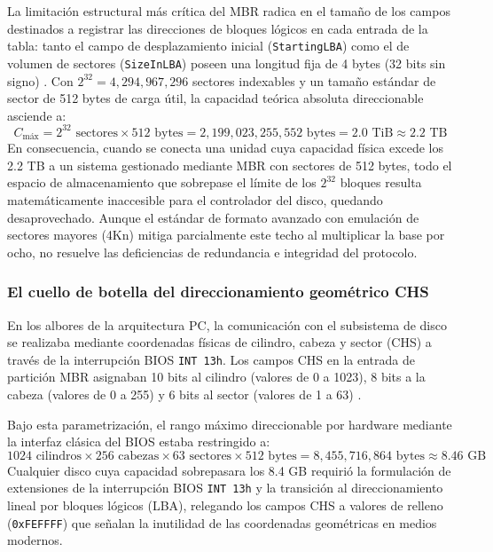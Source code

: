 \documentclass[12pt]{article}
\begin{document}
La limitación estructural más crítica del MBR radica en el tamaño de los campos destinados a registrar las direcciones de bloques lógicos en cada entrada de la tabla: tanto el campo de desplazamiento inicial (\texttt{StartingLBA}) como el de volumen de sectores (\texttt{SizeInLBA}) poseen una longitud fija de 4 bytes (32 bits sin signo) \parencite[\S 5.2.1, p.\ 111]{uefi2024specification}. Con $2^{32} = 4{,}294{,}967{,}296$ sectores indexables y un tamaño estándar de sector de 512 bytes de carga útil, la capacidad teórica absoluta direccionable asciende a:
\begin{equation}
    C_{\text{máx}} = 2^{32} \text{ sectores} \times 512\text{ bytes} = 2{,}199{,}023{,}255{,}552\text{ bytes} = 2.0\text{ TiB} \approx 2.2\text{ TB}
\end{equation}
En consecuencia, cuando se conecta una unidad cuya capacidad física excede los 2.2 TB a un sistema gestionado mediante MBR con sectores de 512 bytes, todo el espacio de almacenamiento que sobrepase el límite de los $2^{32}$ bloques resulta matemáticamente inaccesible para el controlador del disco, quedando desaprovechado. Aunque el estándar de formato avanzado con emulación de sectores mayores (4Kn) mitiga parcialmente este techo al multiplicar la base por ocho, no resuelve las deficiencias de redundancia e integridad del protocolo.

\subsubsection{El cuello de botella del direccionamiento geométrico CHS}

En los albores de la arquitectura PC, la comunicación con el subsistema de disco se realizaba mediante coordenadas físicas de cilindro, cabeza y sector (CHS) a través de la interrupción BIOS \texttt{INT 13h}. Los campos CHS en la entrada de partición MBR asignaban 10 bits al cilindro (valores de 0 a 1023), 8 bits a la cabeza (valores de 0 a 255) y 6 bits al sector (valores de 1 a 63) \parencite[\S 5.2.1, p.\ 111]{uefi2024specification}.

Bajo esta parametrización, el rango máximo direccionable por hardware mediante la interfaz clásica del BIOS estaba restringido a:
\begin{equation}
    1024\text{ cilindros} \times 256\text{ cabezas} \times 63\text{ sectores} \times 512\text{ bytes} = 8{,}455{,}716{,}864\text{ bytes} \approx 8.46\text{ GB}
\end{equation}
Cualquier disco cuya capacidad sobrepasara los 8.4 GB requirió la formulación de extensiones de la interrupción BIOS \texttt{INT 13h} y la transición al direccionamiento lineal por bloques lógicos (LBA), relegando los campos CHS a valores de relleno (\texttt{0xFEFFFF}) que señalan la inutilidad de las coordenadas geométricas en medios modernos.
\end{document}
